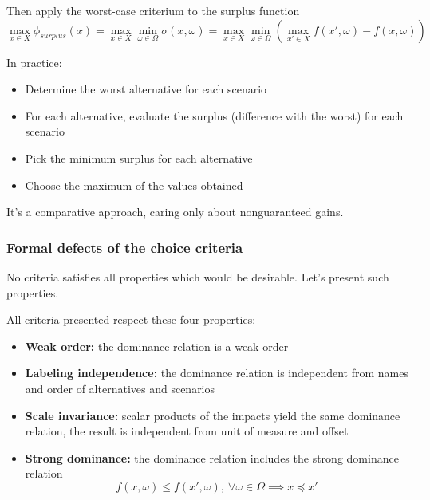 Then apply the worst-case criterium to the surplus function
$$ \max_{x \in X} \phi_{surplus} (x) = \max_{x \in X} \min_{\omega \in \Omega} \sigma (x, \omega) = \max_{x \in X} \min_{\omega \in \Omega} \left(\max_{x' \in X} f(x', \omega) - f(x, \omega) \right)$$

In practice: 
\begin{itemize}
	\item Determine the worst alternative for each scenario
	
	\item For each alternative, evaluate the surplus (difference with the worst) for each scenario
	
	\item Pick the minimum surplus for each alternative
	
	\item Choose the maximum of the values obtained
\end{itemize}

It's a comparative approach, caring only about nonguaranteed gains.

\subsubsection{Formal defects of the choice criteria}

No criteria satisfies all properties which would be desirable. Let's present such properties. 

All criteria presented respect these four properties: 
\begin{itemize}
	\item \textbf{Weak order:} the dominance relation is a weak order
	
	\item \textbf{Labeling independence:} the dominance relation is independent from names and order of alternatives and scenarios
	
	\item \textbf{Scale invariance:} scalar products of the impacts yield the same dominance relation, the result is independent from unit of measure and offset 
	
	\item \textbf{Strong dominance:} the dominance relation includes the strong dominance relation 
	$$ f(x, \omega) \leq f (x', \omega) , \ \forall \omega \in \Omega \implies x \preceq x' $$
\end{itemize}


